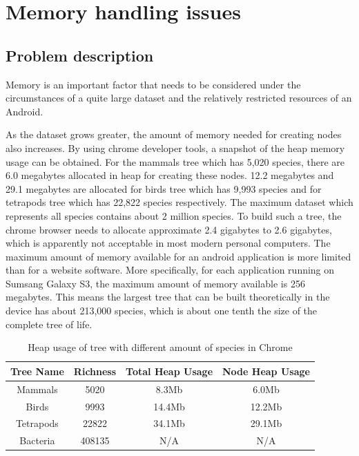 \documentclass[MSc]{icldt}
\begin{document}
\chapter{Memory handling issues}

\section{Problem description}

Memory is an important factor that needs to be considered under the circumstances of a quite large dataset and the relatively restricted resources of an Android.

As the dataset grows greater, the amount of memory needed for creating nodes also increases. By using chrome developer tools,  a snapshot of the heap memory usage can be obtained. For the mammals tree which has 5,020 species, there are 6.0 megabytes allocated in heap for creating these nodes. 12.2 megabytes and 29.1 megabytes are allocated for birds tree which has 9,993 species and for tetrapods tree which has 22,822 species respectively. The maximum dataset which represents all species contains about 2 million species. To build such a tree, the chrome browser needs to allocate approximate 2.4 gigabytes to 2.6 gigabytes, which is apparently not acceptable in most modern personal computers. The maximum amount of memory available for an android application is more limited than for a website software. More specifically, for each application running on Sumsang Galaxy S3, the maximum amount of memory available is 256 megabytes. This means the largest tree that can be built theoretically in the device has about 213,000 species, which is about one tenth the size of the complete tree of life.
\begin{table} [H]
	\centering %
	\begin{tabular}{|c c c c|} %
		\hline %
		Tree Name & Richness  &  Total Heap Usage & Node Heap Usage\\%
		\hline  %
		Mammals & 5020 &  8.3Mb & 6.0Mb\\  %
		\hline
		Birds & 9993 &  14.4Mb & 12.2Mb\\
		\hline
		Tetrapods & 22822 & 34.1Mb & 29.1Mb\\ 
		\hline %
		Bacteria & 408135 & N/A & N/A \\ [1ex] %
		\hline
	\end{tabular}
	\label{table:nonlin} %
	\caption{Heap usage of tree with different amount of species in Chrome} %
\end{table}
\end{document}
